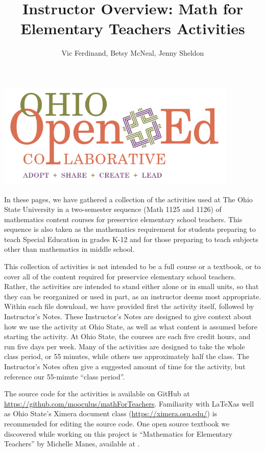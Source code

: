 \documentclass[nooutcomes]{ximera}
\title{Instructor Overview: Math for Elementary Teachers Activities}
\author{Vic Ferdinand, Betsy McNeal, Jenny Sheldon}
\begin{document}
\begin{abstract}

\end{abstract}\maketitle

\includegraphics[height=2in]{elementaryActivities/graphics/OOECLogo.png}

In these pages, we have gathered a collection of the activities used at The Ohio State University in a 
two-semester sequence (Math 1125 and 1126) of mathematics content courses for preservice elementary 
school teachers.  This sequence is also taken as the mathematics requirement for students preparing 
to teach Special Education in grades K-12 and for those preparing to teach subjects other than 
mathematics in middle school.

This collection of activities is not intended to be a full course or a textbook, or to cover all of the 
content required for preservice elementary school teachers.  Rather, the activities are intended to 
stand either alone or in small units, so that they can be reorganized or used in part, as an 
instructor deems most appropriate.  Within each file download, we have provided first the activity 
itself, followed by Instructor's Notes.  These Instructor's Notes are designed to give context about 
how we use the activity at Ohio State, as well as what content is assumed before starting the 
activity. At Ohio State, the courses are each five credit 
hours, and run five days per week.  Many of the activities are designed to take the whole class 
period, or 55 minutes, while others use approximately half the class.  
The Instructor's Notes often give a suggested amount of time for the 
activity, but reference our 55-minute ``class period''.

The source code for the activities is available on GitHub at 
\url{https://github.com/mooculus/mathForTeachers}.  Familiarity with \LaTeX as well as Ohio State's
Ximera document class (\url{https://ximera.osu.edu/}) is recommended for editing the source code.
One open source textbook we discovered while working on this project is ``Mathematics for Elementary 
Teachers'' by Michelle Manes, available at 
.
\end{document}
